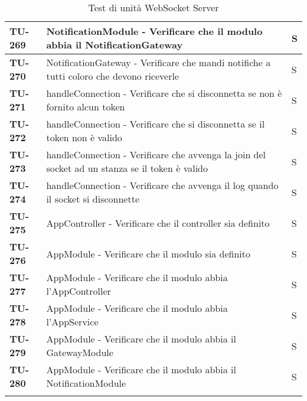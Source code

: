 \begin{longtable}{|>{\centering\arraybackslash}p{2cm}|p{15cm}|p{1cm}|}
  \hline
  \rowcolor{gray!10}
  \textbf{TU-269} & NotificationModule - Verificare che il modulo abbia il NotificationGateway & S \\
  \hline
  \rowcolor{gray!10}
  \textbf{TU-270} & NotificationGateway - Verificare che mandi notifiche a tutti coloro che devono riceverle & S \\
  \hline
  \rowcolor{gray!10}
  \textbf{TU-271} & handleConnection - Verificare che si disconnetta se non è fornito alcun token & S \\
  \hline
  \rowcolor{gray!10}
  \textbf{TU-272} & handleConnection - Verificare che si disconnetta se il  token non è valido & S \\
  \hline
  \rowcolor{gray!10}
  \textbf{TU-273} & handleConnection - Verificare che avvenga la join del socket ad un stanza  se il token è valido & S \\
  \hline
  \rowcolor{gray!10}
  \textbf{TU-274} & handleConnection - Verificare che avvenga il log quando il socket si disconnette & S \\
  \hline
  \rowcolor{gray!10}
  \textbf{TU-275} & AppController - Verificare che il controller sia definito & S \\
  \hline
  \rowcolor{gray!10}
  \textbf{TU-276} & AppModule - Verificare che il modulo sia definito & S \\
  \hline
  \rowcolor{gray!10}
  \textbf{TU-277} & AppModule - Verificare che il modulo abbia l'AppController & S \\
  \hline
  \rowcolor{gray!10}
  \textbf{TU-278} & AppModule - Verificare che il modulo abbia l'AppService & S \\
  \hline
  \rowcolor{gray!10}
  \textbf{TU-279} & AppModule - Verificare che il modulo abbia il GatewayModule & S \\
  \hline
  \rowcolor{gray!10}
  \textbf{TU-280} & AppModule - Verificare che il modulo abbia il NotificationModule & S \\
  \hline

    \caption{Test di unità WebSocket Server} 
\end{longtable}



